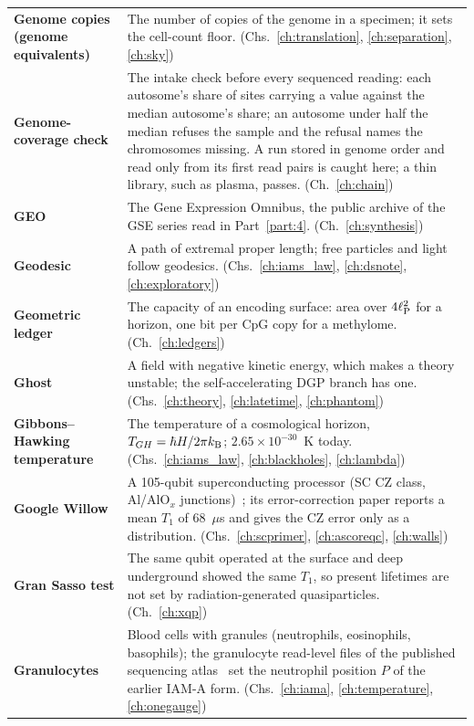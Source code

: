 {\begin{longtable}{@{}>{\raggedright\arraybackslash}p{}>{\raggedright\arraybackslash}p{}@{}}
\textbf{Genome copies (genome equivalents)} & The number of copies of the genome in a specimen; it sets the cell-count floor. {\footnotesize(Chs.~\ref{ch:translation}, \ref{ch:separation}, \ref{ch:sky})}\\[1pt]
\textbf{Genome-coverage check} & The intake check before every sequenced reading: each autosome's share of sites carrying a value against the median autosome's share; an autosome under half the median refuses the sample and the refusal names the chromosomes missing. A run stored in genome order and read only from its first read pairs is caught here; a thin library, such as plasma, passes. {\footnotesize(Ch.~\ref{ch:chain})}\\[1pt]
\textbf{GEO} & The Gene Expression Omnibus, the public archive of the GSE series read in Part~\ref{part:4}. {\footnotesize(Ch.~\ref{ch:synthesis})}\\[1pt]
\textbf{Geodesic} & A path of extremal proper length; free particles and light follow geodesics. {\footnotesize(Chs.~\ref{ch:iams_law}, \ref{ch:dsnote}, \ref{ch:exploratory})}\\[1pt]
\textbf{Geometric ledger} & The capacity of an encoding surface: area over $4\ell_{\mathrm P}^2$ for a horizon, one bit per CpG copy for a methylome. {\footnotesize(Ch.~\ref{ch:ledgers})}\\[1pt]
\textbf{Ghost} & A field with negative kinetic energy, which makes a theory unstable; the self-accelerating DGP branch has one. {\footnotesize(Chs.~\ref{ch:theory}, \ref{ch:latetime}, \ref{ch:phantom})}\\[1pt]
\textbf{Gibbons--Hawking temperature} & The temperature of a cosmological horizon, $T_{GH}=\hbar H/2\pi k_{\mathrm B}$; $2.65\times10^{-30}$~K today. {\footnotesize(Chs.~\ref{ch:iams_law}, \ref{ch:blackholes}, \ref{ch:lambda})}\\[1pt]
\textbf{Google Willow} & A 105-qubit superconducting processor (SC CZ class, Al/AlO$_x$ junctions)~\cite{GoogleWillow2025}; its error-correction paper reports a mean $T_1$ of 68~$\mu$s and gives the CZ error only as a distribution. {\footnotesize(Chs.~\ref{ch:scprimer}, \ref{ch:ascoreqc}, \ref{ch:walls})}\\[1pt]
\textbf{Gran Sasso test} & The same qubit operated at the surface and deep underground showed the same $T_1$, so present lifetimes are not set by radiation-generated quasiparticles. {\footnotesize(Ch.~\ref{ch:xqp})}\\[1pt]
\textbf{Granulocytes} & Blood cells with granules (neutrophils, eosinophils, basophils); the granulocyte read-level files of the published sequencing atlas~\cite{Loyfer2023} set the neutrophil position $P$ of the earlier IAM-A form. {\footnotesize(Chs.~\ref{ch:iama}, \ref{ch:temperature}, \ref{ch:onegauge})}\\[1pt]

\end{longtable}}

